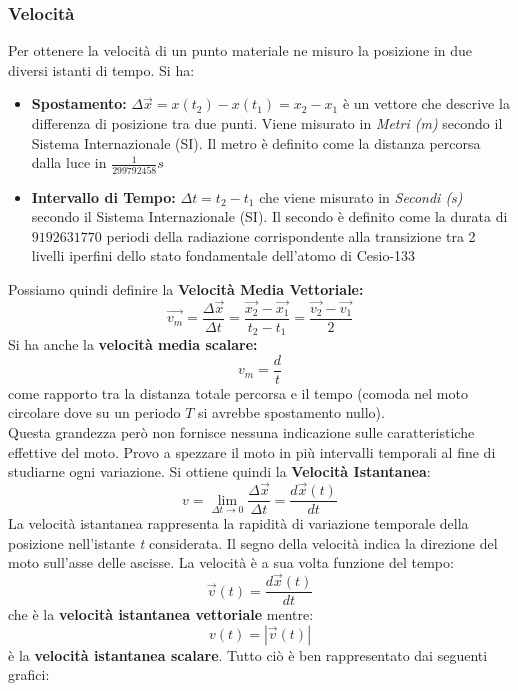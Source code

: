 \documentclass[a4paper,12pt, oneside]{book}
\begin{document}
\subsubsection{Velocità}
Per ottenere la velocità di un punto materiale ne misuro la posizione in due diversi istanti di tempo. Si ha:
\begin{itemize}
\item \textbf{Spostamento:} $\Delta \vec{x}= x(t_2)-x(t_1)=x_2-x_1$ è un vettore che descrive la differenza di posizione tra due punti. Viene misurato in \textit{Metri (m)} secondo il Sistema Internazionale (SI). Il metro è definito come la distanza percorsa dalla luce in $\frac{1}{299792458}s$ 
\item \textbf{Intervallo di Tempo:} $\Delta t=t_2-t_1$ che viene misurato in \textit{Secondi (s)} secondo il Sistema Internazionale (SI). Il secondo è definito come la durata di $9192631770$ periodi della radiazione corrispondente alla transizione tra 2 livelli iperfini dello stato fondamentale dell'atomo di Cesio-133
\end{itemize}
Possiamo quindi definire la \textbf{Velocità Media Vettoriale:}
$$\vec{v_m}=\frac{\Delta \vec{x}}{\Delta t}=\frac{\vec{x_2}-\vec{x_1}}{t_2-t_1}=\frac{\vec{v_2}-\vec{v_1}}{2}$$
Si ha anche la \textbf{velocità media scalare:}
$$v_m=\frac{d}{t}$$
come rapporto tra la distanza totale percorsa e il tempo (comoda nel moto circolare dove su un periodo $T$ si avrebbe spostamento nullo).\\
Questa grandezza però non fornisce nessuna indicazione sulle caratteristiche effettive del moto. Provo a spezzare il moto in più intervalli temporali al fine di studiarne ogni variazione. Si ottiene quindi la \textbf{Velocità Istantanea}:
$$v=\lim_{\Delta t \to 0}\frac{\Delta \vec{x}}{\Delta t}=\frac{d \vec{x}(t)}{d t}$$
La velocità istantanea rappresenta la rapidità di variazione temporale della posizione nell'istante \textit{t} considerata. Il segno della velocità indica la direzione del moto sull'asse delle ascisse. La velocità è a sua volta funzione del tempo:
$$\vec{v}(t)=\frac{d\vec{x}(t)}{dt}$$
che è la \textbf{velocità istantanea vettoriale} mentre:
$$v(t)=|\vec{v}(t)|$$
è la \textbf{velocità istantanea scalare}. 
Tutto ciò è ben rappresentato dai seguenti grafici:
\end{document}
